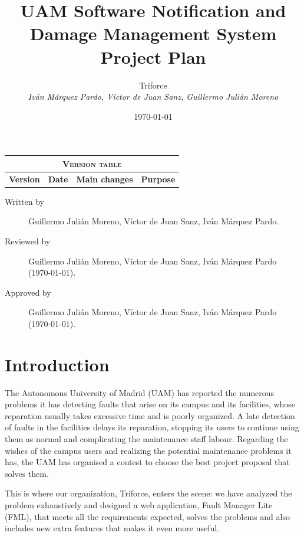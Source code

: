 \documentclass[11pt]{report}
\title{UAM Software Notification and Damage Management System \\ Project Plan}
\date{\today}
\author{{\Large Triforce} \\ \vspace{5pt} \textit{Iván Márquez Pardo, Víctor de Juan Sanz, Guillermo Julián Moreno}}
\begin{document}
\maketitle

\begin{table}[hbtp]
\centering
\begin{tabular}{|c|c|p{3cm}|p{3.5cm}|}
\hline \multicolumn{4}{|c|}{\textsc{Version table}} \\ \hline \hline
\textbf{Version} & \textbf{Date} & \textbf{Main changes} & \textbf{Purpose} \\ \hline
\end{tabular}
\end{table}

\begin{description}
\item[Written by] Guillermo Julián Moreno, Víctor de Juan Sanz, Iván Márquez Pardo.
\item[Reviewed by] Guillermo Julián Moreno, Víctor de Juan Sanz, Iván Márquez Pardo (\today).
\item[Approved by] Guillermo Julián Moreno, Víctor de Juan Sanz, Iván Márquez Pardo (\today).
\end{description}

\newpage

\begin{abstract}
\end{abstract}

\tableofcontents
\newpage
\pagestyle{plain}

\chapter{Introduction}

The Autonomous University of Madrid (UAM) has reported the numerous problems it has detecting faults that arise on its campus and its facilities, whose reparation usually takes excessive time and is poorly organized. A late detection of faults in the facilities delays its reparation, stopping its users to continue using them as normal and complicating the maintenance staff labour. Regarding the wishes of the campus users and realizing the potential maintenance problems it has, the UAM has organised a contest to choose the best project proposal that solves them.

This is where our organization, Triforce, enters the scene: we have analyzed the problem exhaustively and designed a web application, Fault Manager Lite (FML), that meets all the requirements expected, solves the problems and also includes new extra features that makes it even more useful.
\end{document}
